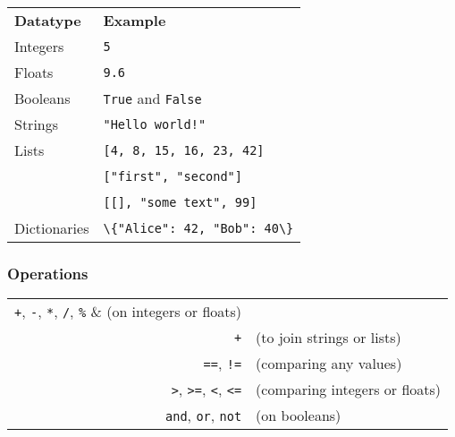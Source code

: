 \documentclass[12pt,twocolumn]{article}
\begin{document}
	
	\begin{tabular}{l l}
		\textbf{Datatype} & \textbf{Example} \\

		Integers &
		\colorbox{codebg}{\lstinline|5|} \\
		
		Floats &
		\colorbox{codebg}{\lstinline|9.6|} \\
		
		Booleans &
		\colorbox{codebg}{\lstinline|True|} and \colorbox{codebg}{\lstinline|False|} \\
		
		Strings &
		\colorbox{codebg}{\lstinline|"Hello world!"|} \\
		
		Lists &
		\colorbox{codebg}{\lstinline|[4, 8, 15, 16, 23, 42]|} \vspace{0.5mm} \\
		\, &
		\colorbox{codebg}{\lstinline|["first", "second"]|} \vspace{0.5mm} \\
		\, &
		\colorbox{codebg}{\lstinline|[[], "some text", 99]|} \vspace{0.5mm} \\
		
		Dictionaries &
		\colorbox{codebg}{\lstinline|\{"Alice": 42, "Bob": 40\}|}
	\end{tabular}
	
	\subsubsection*{Operations}
	
	\begin{tabular}{r l}
		\lstinline|+|, \lstinline|-|, \lstinline|*|, \lstinline|/|, \lstinline|%| &
		(on integers or floats) \\
	
		\lstinline|+| & (to join strings or lists) \\
	
		\lstinline|==|, \lstinline|!=| & (comparing any values) \\
	
		\lstinline|>|, \lstinline|>=|, \lstinline|<|, \lstinline|<=| &
		(comparing integers or floats) \\
		
		\lstinline|and|, \lstinline|or|, \lstinline|not| & (on booleans)
	\end{tabular}
	
\end{document}
